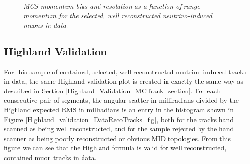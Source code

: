 \begin{figure}
\centering
\mbox{
	\quad
	}
\caption{\textit{MCS momentum bias and resolution as a function of range momentum for the selected, well reconstructed neutrino-induced muons in {\ub} data.}}
\label{MCS_range_bias_resolution_DataRecoTrack_fig}
\end{figure}



\subsection{Highland Validation}\label{Highland_Validation_DataRecoTrack_section}
For this sample of contained, selected, well-reconstructed neutrino-induced tracks in {\ub} data, the same Highland validation plot is created in exactly the same way as described in Section \ref{Highland_Validation_MCTrack_section}. For each consecutive pair of segments, the angular scatter in milliradians divided by the Highland expected RMS in millradians is an entry in the histogram shown in Figure \ref{Highland_validation_DataRecoTracks_fig}, both for the tracks hand scanned as being well reconstructed, and for the sample rejected by the hand scanner as being poorly reconstructed or obvious MID topologies. From this figure we can see that the Highland formula is valid for well reconstructed, contained muon tracks in data.


